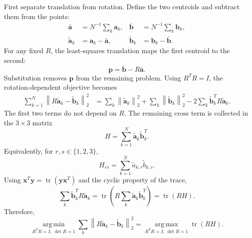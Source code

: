 \documentclass[11pt]{article}
\newcommand{\vct}[1]{\bm{#1}}
\newcommand{\tr}{\operatorname{tr}}
\newcommand{\norm}[1]{\left\|#1\right\|_2}
\begin{document}
First separate translation from rotation. Define the two centroids and subtract them from the points:
\begin{align}
\bar{\vct{a}}&=N^{-1}\sum_k\vct{a}_k,&
\bar{\vct{b}}&=N^{-1}\sum_k\vct{b}_k,\\
\widetilde{\vct{a}}_k&=\vct{a}_k-\bar{\vct{a}},&
\widetilde{\vct{b}}_k&=\vct{b}_k-\bar{\vct{b}}.
\end{align}
For any fixed $R$, the least-squares translation maps the first centroid to the second:
\begin{equation}
\vct{p}=\bar{\vct{b}}-R\bar{\vct{a}}.
\end{equation}
Substitution removes $\vct{p}$ from the remaining problem. Using $R^TR=I$, the rotation-dependent objective becomes
\begin{align}
\sum_{k=1}^{N}\norm{R\widetilde{\vct{a}}_k-\widetilde{\vct{b}}_k}^2
&=\sum_k\norm{\widetilde{\vct{a}}_k}^2
  +\sum_k\norm{\widetilde{\vct{b}}_k}^2
  -2\sum_k\widetilde{\vct{b}}_k^TR\widetilde{\vct{a}}_k.
\end{align}
The first two terms do not depend on $R$. The remaining cross term is collected in the $3\times3$ matrix
\begin{equation}
H=\sum_{k=1}^{N}\widetilde{\vct{a}}_k\widetilde{\vct{b}}_k^T.
\end{equation}
Equivalently, for $r,s\in\{1,2,3\}$,
\begin{equation}
H_{rs}=\sum_{k=1}^{N}
\widetilde a_{k,r}\widetilde b_{k,s}.
\end{equation}
Using $\vct{x}^T\vct{y}=\tr(\vct{y}\vct{x}^T)$ and the cyclic property of the trace,
\begin{equation}
\sum_k\widetilde{\vct{b}}_k^TR\widetilde{\vct{a}}_k
=\tr\!\left(
R\sum_k\widetilde{\vct{a}}_k\widetilde{\vct{b}}_k^T
\right)
=\tr(RH).
\end{equation}
Therefore,
\begin{equation}
\underset{R^TR=I,\ \det R=1}{\operatorname{arg\,min}}
\sum_k\norm{R\widetilde{\vct{a}}_k-\widetilde{\vct{b}}_k}^2
=
\underset{R^TR=I,\ \det R=1}{\operatorname{arg\,max}}
\tr(RH).
\end{equation}
\end{document}
